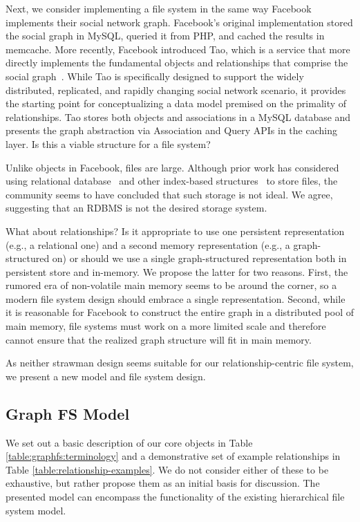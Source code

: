 Next, we consider implementing a file system in the same way Facebook
implements their social network graph.
Facebook's original implementation stored the social graph in MySQL, queried
it from PHP, and cached the results in memcache.
More recently, Facebook introduced Tao, which is a service that more directly
implements the fundamental objects and relationships that comprise the
social graph~\cite{bronson2013tao}.
While Tao is specifically designed to support the widely distributed,
replicated, and rapidly changing social network scenario, it provides the
starting point for conceptualizing a data model premised on the primality of
relationships.
Tao stores both objects and associations in a MySQL database and presents
the graph abstraction via Association and Query APIs in the caching layer.
Is this a viable structure for a file system?

Unlike objects in Facebook, files are large.
Although prior work has considered using relational
database~\cite{olson1993design} and other index-based
structures~\cite{spillane2013vttree}  to store files,
the community seems to have
concluded that such storage is not ideal. We agree, suggesting that
an RDBMS is not the desired storage system.

What about relationships? Is it appropriate
to use one persistent representation (e.g., a relational one) and a second
memory representation (e.g., a graph-structured on) or
should we use a single graph-structured representation both in persistent store
and in-memory.
We propose the latter for two reasons.
First, the rumored era of non-volatile main memory seems to be around the
corner, so a modern file system design should embrace a single
representation.
Second, while it is reasonable for Facebook to construct the entire graph in
a distributed pool of main memory, file systems must work on a more limited
scale and therefore cannot ensure that the realized graph structure will fit
in main memory.

As neither strawman design seems suitable for our relationship-centric file
system, we present a new model and file system design.

\subsection{Graph FS Model}
\label{sec:graphfs:model}

We set out a basic description of our core objects in Table \ref{table:graphfs:terminology}
and a demonstrative set of example relationships in Table \ref{table:relationship-examples}.
We do not consider either of these to be exhaustive, but rather propose them as an initial
basis for discussion.
The presented model can encompass
the functionality of the existing hierarchical file system model.

